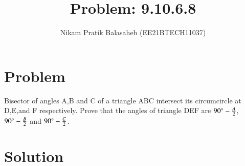\documentclass[journal,12pt,twocolumn]{IEEEtran}
\begin{document}
\let\StandardTheFigure\thefigure
\let\vec\mathbf
\renewcommand{\thefigure}{\theproblem}



\def\putbox#1#2#3{\makebox[0in][l]{\makebox[#1][l]{}\raisebox{\baselineskip}[0in][0in]{\raisebox{#2}[0in][0in]{#3}}}}
     \def\rightbox#1{\makebox[0in][r]{#1}}
     \def\centbox#1{\makebox[0in]{#1}}
     \def\topbox#1{\raisebox{-\baselineskip}[0in][0in]{#1}}
     \def\midbox#1{\raisebox{-0.5\baselineskip}[0in][0in]{#1}}

\vspace{3cm}


\title{Problem: 9.10.6.8}
\author{Nikam Pratik Balasaheb (EE21BTECH11037)}





\maketitle

\newpage


\bigskip

\renewcommand{\thefigure}{\theenumi}
\renewcommand{\thetable}{\theenumi}

\section{Problem}

Bisector of angles A,B and C of a triangle ABC intersect its circumcircle at D,E,and F respectively. Prove that the angles of triangle DEF are $90{\degree} - \frac{A}{2}$, $90{\degree}-\frac{B}{2}$ and $90{\degree} - \frac{C}{2}$.
\section{Solution}
\end{document}
